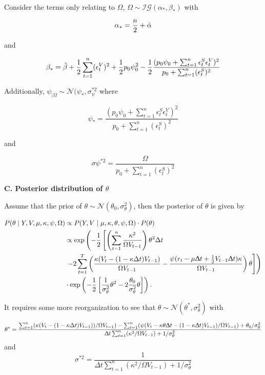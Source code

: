 \documentclass[12pt,a4paper]{article}
\numberwithin{equation}{section}
\begin{document}
Consider the terms only relating to $\Omega$, $\Omega \sim \mathcal{IG}(\alpha_*, \beta_*)$ with

\[\alpha_* = \frac{n}{2} + \Tilde{\alpha}\] 

and 

\[\beta_* = \Tilde{\beta} + \frac{1}{2} \sum_{t=1}^n (\epsilon_t^V)^2 + \frac{1}{2} p_0 \psi_0^2 - \frac{1}{2} \frac{(p_0 \psi_0 + \sum_{t=1}^n \epsilon_t^S \epsilon_t^V)^2}{p_0 + \sum_{t=1}^n (\epsilon_t^S )^2} \] 

Additionally, $\psi_{|\Omega} \sim \mathcal{N} (\psi_*, \sigma_\psi^{*2}$ where

\[\psi_* =\frac{(p_0 \psi_0 + \sum_{t=1}^n \epsilon_t^S \epsilon_t^V)^2}{p_0 + \sum_{t=1}^n (\epsilon_t^S )^2} \]

and 

\[\sigma\psi^{*2} = \frac{\Omega}{p_0 + \sum_{t=1}^n (\epsilon_t^S)^2 }\]

\textbf{C. Posterior distribution of $\theta$}

Assume that the prior of $\theta \sim \mathcal{N}(\theta_0, \sigma_\theta^2)$, then the posterior of $\theta$ is given by

\begin{align*}
P(\theta \mid Y, V, \mu, \kappa, \psi, \Omega) & \propto P(Y, V \mid \mu, \kappa, \theta, \psi, \Omega) \cdot P(\theta) \\
& \propto\exp\left(-\frac{1}{2} \left[\left(\sum_{t=1}^n \frac{\kappa^2}{\Omega V_{t-1}}\right) \theta^2 \Delta t \right. \right. \\ 
& \left. \left. - 2\sum_{t=1}^T \left(\frac{\kappa (V_t - (1-\kappa \Delta t) V_{t-1})}{\Omega V_{t-1}} - \frac{\psi (r_t -\mu \Updelta t + \frac{1}{2} V_{t-1} \Updelta t) \kappa}{\Omega V_{t-1}} \right) \theta \right] \right) \\
& \cdot \exp\left(-\frac{1}{2} \left[\frac{1}{\sigma_\theta^2} \theta^2 - 2 \frac{\theta_0}{\sigma_\theta^2} \theta \right] \right).
\end{align*}

It requires some more reorganization to see that $\theta \sim \mathcal{N}(\theta^*, \sigma_\theta^2)$ with

\[
\theta^* = \frac{\sum_{t=1}^n (\kappa (V_t - (1-\kappa \Delta t) V_{t-1}))/\Omega V_{t-1}) - \sum_{t=1}^n (\psi (V_t - \kappa \theta \Updelta t - (1 - \kappa \Updelta t)V_{t-1})/\Omega V_{t-1}) + \theta_0/\sigma_\theta^2}{\Updelta t \sum_{t=1}^n (\kappa^2 / \Omega V_{t-1}) + 1 / \sigma_\theta^2}
\]
and
\[
\sigma^{*2} = \frac{1}{\Delta t \sum_{t=1}^n (\kappa^2 / \Omega V_{t-1}) + 1 / \sigma_\theta^2}
\]
\end{document}
